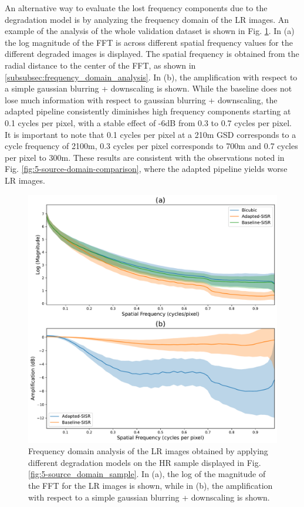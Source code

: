         An alternative way to evaluate the lost frequency components due to the degradation model is by analyzing the frequency domain of the LR images.
        An example of the analysis of the whole validation dataset is shown in Fig. \ref{fig:5-lr-images-fft-comparison}. 
        In (a) the log magnitude of the FFT is across different spatial frequency values for the different degraded images is displayed. 
        The spatial frequency is obtained from the radial distance to the center of the FFT, as shown in \ref{subsubsec:frequency_domain_analysis}.
        In (b), the amplification with respect to a simple gaussian blurring + downscaling is shown. 
        While the baseline does not lose much information with respect to gaussian blurring + downscaling, the adapted pipeline consistently diminishes high frequency components starting at 0.1 cycles per pixel, with a stable effect of -6dB from 0.3 to 0.7 cycles per pixel. 
        It is important to note that 0.1 cycles per pixel at a 210m GSD corresponds to a cycle frequency of 2100m, 0.3 cycles per pixel corresponds to 700m and 0.7 cycles per pixel to 300m.
        These results are consistent with the observations noted in Fig. \ref{fig:5-source-domain-comparison}, where the adapted pipeline yields worse LR images.
    
        \begin{figure}[H]
            \centering
            \includegraphics[scale=0.5]{Includes/5-source-lr-amplification-statistics.pdf}
            \caption{Frequency domain analysis of the LR images obtained by applying different degradation models on the HR sample displayed in Fig. \ref{fig:5-source_domain_sample}.
                     In (a), the log of the magnitude of the FFT for the LR images is shown,
                     while in (b), the amplification with respect to a  simple gaussian blurring + downscaling is shown.}
            \label{fig:5-lr-images-fft-comparison}
        \end{figure}

